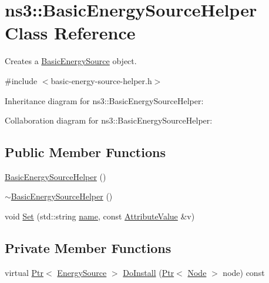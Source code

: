 \hypertarget{classns3_1_1BasicEnergySourceHelper}{}\section{ns3\+:\+:Basic\+Energy\+Source\+Helper Class Reference}
\label{classns3_1_1BasicEnergySourceHelper}


Creates a \hyperlink{classns3_1_1BasicEnergySource}{Basic\+Energy\+Source} object.  




{\ttfamily \#include $<$basic-\/energy-\/source-\/helper.\+h$>$}



Inheritance diagram for ns3\+:\+:Basic\+Energy\+Source\+Helper\+:


Collaboration diagram for ns3\+:\+:Basic\+Energy\+Source\+Helper\+:
\subsection*{Public Member Functions}
\begin{DoxyCompactItemize}
\item 
\hyperlink{classns3_1_1BasicEnergySourceHelper_ab384285ae5486924de9748922cd3fb72}{Basic\+Energy\+Source\+Helper} ()
\item 
\hyperlink{classns3_1_1BasicEnergySourceHelper_a03fce8785ede16f77954a53c937ae894}{$\sim$\+Basic\+Energy\+Source\+Helper} ()
\item 
void \hyperlink{classns3_1_1BasicEnergySourceHelper_aa07c8c1c4a4ced92b8fc51bf4be4de3f}{Set} (std\+::string \hyperlink{generate__test__data__lte__spectrum__model_8m_ab74e6bf80237ddc4109968cedc58c151}{name}, const \hyperlink{classns3_1_1AttributeValue}{Attribute\+Value} \&v)
\end{DoxyCompactItemize}
\subsection*{Private Member Functions}
\begin{DoxyCompactItemize}
\item 
virtual \hyperlink{classns3_1_1Ptr}{Ptr}$<$ \hyperlink{classns3_1_1EnergySource}{Energy\+Source} $>$ \hyperlink{classns3_1_1BasicEnergySourceHelper_af7d2739bd037fe4d2bbd0ca3800bf143}{Do\+Install} (\hyperlink{classns3_1_1Ptr}{Ptr}$<$ \hyperlink{classns3_1_1Node}{Node} $>$ node) const 
\end{DoxyCompactItemize}
